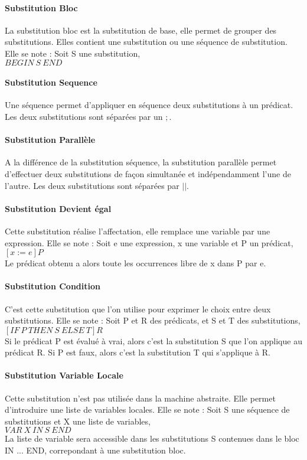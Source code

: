 \paragraph{Substitution Bloc}
La substitution bloc est la substitution de base, elle permet de grouper des
substitutions. Elles contient une substitution ou une séquence de substitution.
Elle se note : Soit S une substitution, \\
$BEGIN~ S~ END$ 

\paragraph{Substitution Sequence}
Une séquence permet d'appliquer en séquence deux substitutions à un
prédicat. Les deux substitutions sont séparées par un $;$.

\paragraph{Substitution Parallèle}
A la différence de la substitution séquence, la substitution parallèle permet
d'effectuer deux substitutions de façon simultanée et indépendamment l'une de
l'autre. Les deux substitutions sont séparées par $||$.

\paragraph{Substitution Devient égal}
Cette substitution réalise l'affectation, elle remplace une variable
par une expression. Elle se note : Soit e une expression, x une
variable et P un prédicat, \\ 
$[x:=e]P$  \\
Le prédicat obtenu a alors toute les occurrences libre de x dans P par e.

\paragraph{Substitution Condition}
C'est cette substitution que l'on utilise pour exprimer le choix entre deux
substitutions. Elle se note : Soit P et R des prédicats, et S et T des substitutions,\\
$[IF~ P~ THEN~ S~ ELSE~ T]R$ \\
Si le prédicat P est évalué à vrai, alors c'est la substitution S que l'on
applique au prédicat R. Si P est faux, alors c'est la substitution T qui
s'applique à R.

\paragraph{Substitution Variable Locale}
Cette substitution n'est pas utilisée dans la machine abstraite. Elle permet
d'introduire une liste de variables locales.
Elle se note : Soit S une séquence de substitutions et X une liste de variables,\\
$VAR~ X~ IN~ S~ END$\\
La liste de variable sera accessible dans les substitutions S contenues dans le
bloc IN ... END, correpondant à une substitution bloc.

